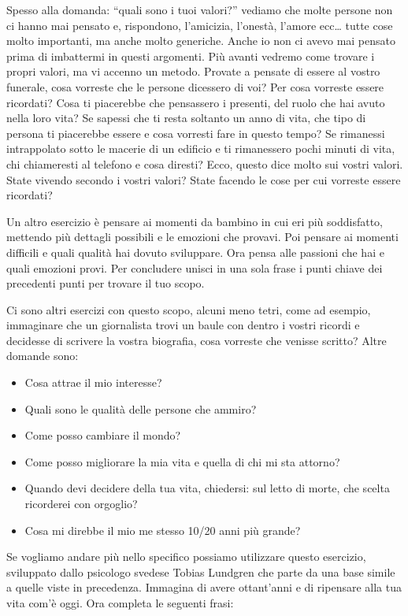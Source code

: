 \documentclass[12pt]{book} %
\begin{document}
Spesso alla domanda: “quali sono i tuoi valori?” vediamo che molte persone non ci hanno mai pensato e, rispondono,
l'amicizia, l'onestà, l'amore ecc… tutte cose molto
importanti, ma anche molto generiche. Anche io non ci avevo mai pensato prima di imbattermi in questi argomenti. Più
avanti vedremo come trovare i propri valori, ma vi accenno un metodo. Provate a pensate di essere al vostro funerale,
cosa vorreste che le persone dicessero di voi? Per cosa vorreste essere ricordati? Cosa ti piacerebbe che pensassero i
presenti, del ruolo che hai avuto nella loro vita? Se sapessi che ti resta soltanto un anno di vita, che tipo di
persona ti piacerebbe essere e cosa vorresti fare in questo tempo? Se rimanessi intrappolato sotto le macerie di un
edificio e ti rimanessero pochi minuti di vita, chi chiameresti al telefono e cosa diresti? Ecco, questo dice molto sui
vostri valori. State vivendo secondo i vostri valori? State facendo le cose per cui vorreste essere ricordati?

Un altro esercizio è pensare ai momenti da bambino in cui eri più soddisfatto, mettendo più dettagli possibili e le
emozioni che provavi. Poi pensare ai momenti difficili e quali qualità hai dovuto sviluppare. Ora pensa alle passioni
che hai e quali emozioni provi. Per concludere unisci in una sola frase i punti chiave dei precedenti punti per trovare
il tuo scopo.

Ci sono altri esercizi con questo scopo, alcuni meno tetri, come ad esempio, immaginare che un giornalista trovi un
baule con dentro i vostri ricordi e decidesse di scrivere la vostra biografia, cosa vorreste che venisse scritto? Altre
domande sono:

\begin{itemize}
\item Cosa attrae il mio interesse?
\item Quali sono le qualità delle persone che ammiro?
\item Come posso cambiare il mondo?
\item Come posso migliorare la mia vita e quella di chi mi sta attorno? 
\item Quando devi decidere della tua vita, chiedersi: sul letto di morte, che scelta ricorderei con orgoglio? 
\item Cosa mi direbbe il mio me stesso 10/20 anni più grande?
\end{itemize}
Se vogliamo andare più nello specifico possiamo utilizzare questo esercizio, sviluppato dallo psicologo svedese Tobias
Lundgren che parte da una base simile a quelle viste in precedenza. Immagina di avere ottant'anni
e di ripensare alla tua vita com'è oggi. Ora completa le seguenti frasi:
\end{document}
